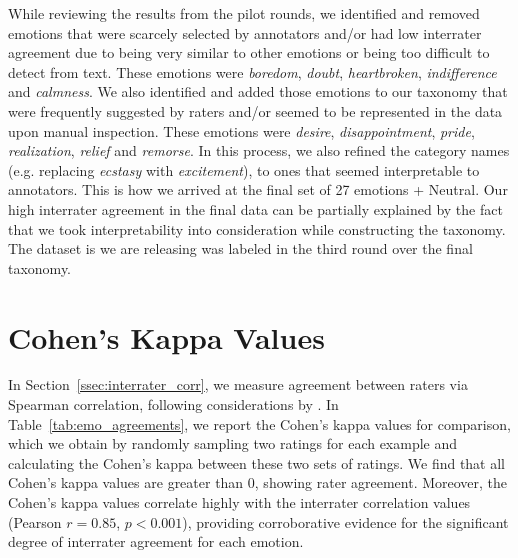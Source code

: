 \documentclass[11pt,a4paper]{article}
\begin{document}
While reviewing the results from the pilot rounds, we identified and removed emotions that were scarcely selected by annotators and/or had low interrater agreement due to being very similar to other emotions or being too difficult to detect from text. These emotions were \emph{boredom}, \emph{doubt}, \emph{heartbroken}, \emph{indifference} and \emph{calmness}. We also identified and added those emotions to our taxonomy that were frequently suggested by raters and/or seemed to be represented in the data upon manual inspection. These emotions were \emph{desire}, \emph{disappointment}, \emph{pride}, \emph{realization}, \emph{relief} and \emph{remorse}. In this process, we also refined the category names (e.g. replacing \emph{ecstasy} with \emph{excitement}), to ones that seemed interpretable to annotators. This is how we arrived at the final set of 27 emotions + Neutral. Our high interrater agreement in the final data can be partially explained by the fact that we took interpretability into consideration while constructing the taxonomy. The dataset is we are releasing was labeled in the third round over the final taxonomy. 

\section{Cohen's Kappa Values}
\label{sec:appendix_kappa}

In Section~\ref{ssec:interrater_corr}, we measure agreement between raters via Spearman correlation, following considerations by \citet{delgado2019cohen}. In Table~\ref{tab:emo_agreements}, we report the Cohen's kappa values for comparison, which we obtain by randomly sampling two ratings for each example and calculating the Cohen's kappa between these two sets of ratings. We find that all Cohen's kappa values are greater than 0, showing rater agreement. Moreover, the Cohen's kappa values correlate highly with the interrater correlation values (Pearson $r=0.85$, $p < 0.001$), providing corroborative evidence for the significant degree of interrater agreement for each emotion. 
\end{document}
